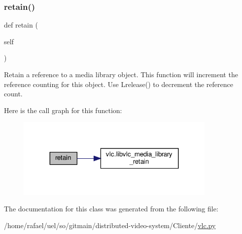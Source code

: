 \subsubsection{\texorpdfstring{retain()}{retain()}}
{\footnotesize\ttfamily def retain (\begin{DoxyParamCaption}\item[{}]{self }\end{DoxyParamCaption})}

\begin{DoxyVerb}Retain a reference to a media library object. This function will
increment the reference counting for this object. Use
L{release}() to decrement the reference count.
\end{DoxyVerb}
 Here is the call graph for this function\+:
\nopagebreak
\begin{figure}[H]
\begin{center}
\leavevmode
\includegraphics[width=275pt]{classvlc_1_1_media_library_a6394d82a0b79f0f91bb059d20ab43490_cgraph}
\end{center}
\end{figure}


The documentation for this class was generated from the following file\+:\begin{DoxyCompactItemize}
\item 
/home/rafael/uel/so/gitmain/distributed-\/video-\/system/\+Cliente/\hyperlink{vlc_8py}{vlc.\+py}\end{DoxyCompactItemize}
